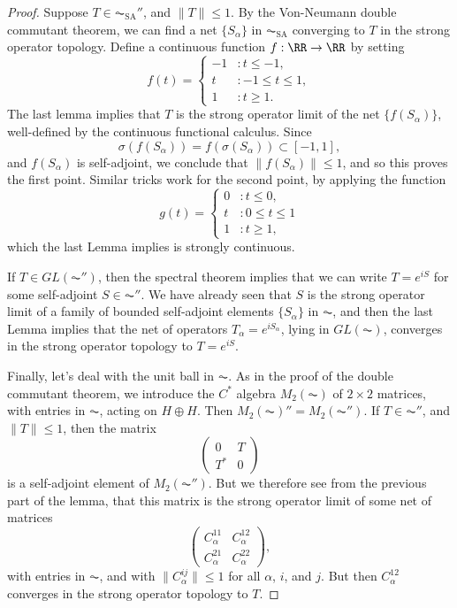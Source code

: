 \begin{proof}
    Suppose $T \in \AC_{\text{SA}}''$, and $\| T \| \leq 1$. By the Von-Neumann double commutant theorem, we can find a net $\{ S_\alpha \}$ in $\AC_{\text{SA}}$ converging to $T$ in the strong operator topology. Define a continuous function $f: \RR \to \RR$ by setting
    \[ f(t) = \begin{cases} -1 &: t \leq -1, \\ t &: -1 \leq t \leq 1, \\ 1 &: t \geq 1. \end{cases} \]
    The last lemma implies that $T$ is the strong operator limit of the net $\{ f(S_\alpha) \}$, well-defined by the continuous functional calculus. Since
    \[ \sigma(f(S_\alpha)) = f(\sigma(S_\alpha)) \subset [-1,1], \]
    and $f(S_\alpha)$ is self-adjoint, we conclude that $\| f(S_\alpha) \| \leq 1$, and so this proves the first point. Similar tricks work for the second point, by applying the function
    \[ g(t) = \begin{cases} 0 &: t \leq 0, \\ t &: 0 \leq t \leq 1 \\ 1 &: t \geq 1, \end{cases} \]
    which the last Lemma implies is strongly continuous.

    If $T \in GL(\AC'')$, then the spectral theorem implies that we can write $T = e^{iS}$ for some self-adjoint $S \in \AC''$. We have already seen that $S$ is the strong operator limit of a family of bounded self-adjoint elements $\{ S_\alpha \}$ in $\AC$, and then the last Lemma implies that the net of operators $T_\alpha = e^{iS_\alpha}$, lying in $GL(\AC)$, converges in the strong operator topology to $T = e^{iS}$.

    Finally, let's deal with the unit ball in $\AC$. As in the proof of the double commutant theorem, we introduce the $C^*$ algebra $M_2(\AC)$ of $2 \times 2$ matrices, with entries in $\AC$, acting on $H \oplus H$. Then $M_2(\AC)'' = M_2(\AC'')$. If $T \in \AC''$, and $\| T \| \leq 1$, then the matrix
    \[ \begin{pmatrix} 0 & T \\ T^* & 0 \end{pmatrix} \]
    is a self-adjoint element of $M_2(\AC'')$. But we therefore see from the previous part of the lemma, that this matrix is the strong operator limit of some net of matrices
    \[ \begin{pmatrix} C_\alpha^{11} & C_\alpha^{12} \\ C_\alpha^{21} & C_\alpha^{22} \end{pmatrix}, \]
    with entries in $\AC$, and with $\| C_\alpha^{ij} \| \leq 1$ for all $\alpha$, $i$, and $j$. But then $C_\alpha^{12}$ converges in the strong operator topology to $T$.
\end{proof}

